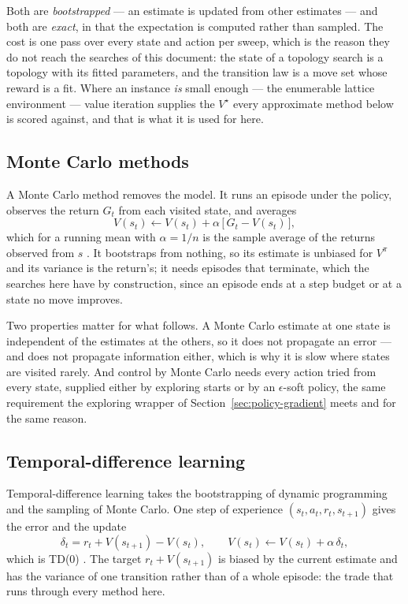 \documentclass[11pt,a4paper]{article}
\begin{document}
Both are \emph{bootstrapped} --- an estimate is updated from other estimates
--- and both are \emph{exact}, in that the expectation is computed rather than
sampled. The cost is one pass over every state and action per sweep, which is
the reason they do not reach the searches of this document: the state of a
topology search is a topology with its fitted parameters, and the transition
law is a move set whose reward is a fit. Where an instance \emph{is} small
enough --- the enumerable lattice environment --- value iteration supplies the
$V^{\star}$ every approximate method below is scored against, and that is what
it is used for here.

\subsection{Monte Carlo methods}
\label{app:rl:mc}

A Monte Carlo method removes the model. It runs an episode under the policy,
observes the return $G_t$ from each visited state, and averages
\begin{equation}
  V(s_t) \gets V(s_t) + \alpha\,\big[\, G_t - V(s_t) \,\big],
  \label{eq:mc-update}
\end{equation}
which for a running mean with $\alpha = 1/n$ is the sample average of the
returns observed from $s$ \citep[Ch.~5]{suttonbarto2018}. It bootstraps from
nothing, so its estimate is unbiased for $V^{\pi}$ and its variance is the
return's; it needs episodes that terminate, which the searches here have by
construction, since an episode ends at a step budget or at a state no move
improves.

Two properties matter for what follows. A Monte Carlo estimate at one state is
independent of the estimates at the others, so it does not propagate an error
--- and does not propagate information either, which is why it is slow where
states are visited rarely. And control by Monte Carlo needs every action tried
from every state, supplied either by exploring starts or by an
$\epsilon$-soft policy, the same requirement the exploring wrapper of
Section~\ref{sec:policy-gradient} meets and for the same reason.

\subsection{Temporal-difference learning}
\label{app:rl:td}

Temporal-difference learning takes the bootstrapping of dynamic programming
and the sampling of Monte Carlo. One step of experience $(s_t, a_t, r_t,
s_{t+1})$ gives the error and the update
\begin{equation}
  \delta_t = r_t + V(s_{t+1}) - V(s_t),
  \qquad
  V(s_t) \gets V(s_t) + \alpha\,\delta_t,
  \label{eq:td-zero}
\end{equation}
which is TD(0) \citep[Ch.~6]{suttonbarto2018}. The target $r_t + V(s_{t+1})$
is biased by the current estimate and has the variance of one transition
rather than of a whole episode: the trade that runs through every method here.
\end{document}
